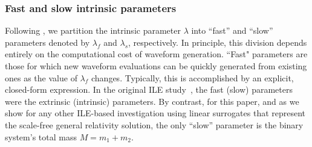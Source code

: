 \documentclass[aps,prd,nofootinbib,showpacs,amssymb,twocolumn]{revtex4}
\begin{document}
\subsubsection{Fast and slow intrinsic parameters}

%

Following \cite{gwastro-PE-AlternativeArchitectures}, we 
%
partition the intrinsic parameter $\lambda$ into ``fast'' and ``slow''
parameters denoted by $\lambda_f$ and $\lambda_s$, respectively.
In principle, this  division depends entirely on the computational cost of waveform generation. 
``Fast" parameters are those for which new waveform evaluations can be quickly generated from existing ones as the value of $\lambda_f$ changes. Typically, this is accomplished by an explicit, closed-form expression. In the original ILE study~\cite{gwastro-PE-AlternativeArchitectures}, the fast (slow) parameters were the extrinsic (intrinsic) parameters. By contrast, for this paper, and as we show for any other ILE-based investigation using linear surrogates that represent the scale-free general relativity solution,
%
the only ``slow'' parameter is the binary system's total mass $M = m_1 + m_2$.
%
%
%
%
%
%
%
%
\end{document}
